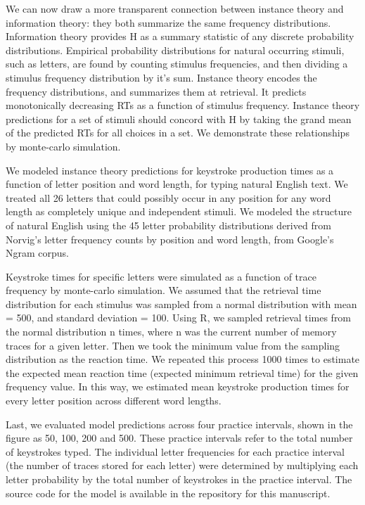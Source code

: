 \documentclass[floatsintext,man]{apa6}
\theoremstyle{definition}
\theoremstyle{definition}
\theoremstyle{definition}
\theoremstyle{remark}
\begin{document}
We can now draw a more transparent connection between instance theory
and information theory: they both summarize the same frequency
distributions. Information theory provides H as a summary statistic of
any discrete probability distributions. Empirical probability
distributions for natural occurring stimuli, such as letters, are found
by counting stimulus frequencies, and then dividing a stimulus frequency
distribution by it's sum. Instance theory encodes the frequency
distributions, and summarizes them at retrieval. It predicts
monotonically decreasing RTs as a function of stimulus frequency.
Instance theory predictions for a set of stimuli should concord with H
by taking the grand mean of the predicted RTs for all choices in a set.
We demonstrate these relationships by monte-carlo simulation.

We modeled instance theory predictions for keystroke production times as
a function of letter position and word length, for typing natural
English text. We treated all 26 letters that could possibly occur in any
position for any word length as completely unique and independent
stimuli. We modeled the structure of natural English using the 45 letter
probability distributions derived from Norvig's letter frequency counts
by position and word length, from Google's Ngram corpus.

Keystroke times for specific letters were simulated as a function of
trace frequency by monte-carlo simulation. We assumed that the retrieval
time distribution for each stimulus was sampled from a normal
distribution with mean = 500, and standard deviation = 100. Using R, we
sampled retrieval times from the normal distribution n times, where n
was the current number of memory traces for a given letter. Then we took
the minimum value from the sampling distribution as the reaction time.
We repeated this process 1000 times to estimate the expected mean
reaction time (expected minimum retrieval time) for the given frequency
value. In this way, we estimated mean keystroke production times for
every letter position across different word lengths.

Last, we evaluated model predictions across four practice intervals,
shown in the figure as 50, 100, 200 and 500. These practice intervals
refer to the total number of keystrokes typed. The individual letter
frequencies for each practice interval (the number of traces stored for
each letter) were determined by multiplying each letter probability by
the total number of keystrokes in the practice interval. The source code
for the model is available in the repository for this manuscript.
\end{document}
